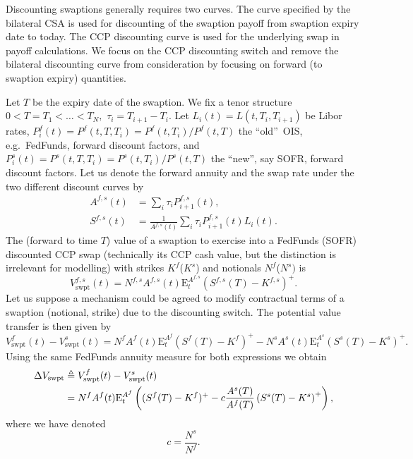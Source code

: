 \documentclass{article}
\begin{document}
Discounting swaptions generally requires two curves. The curve specified by
the bilateral CSA is used for discounting of the swaption payoff from
swaption expiry date to today. The CCP discounting curve is used for the
underlying swap in payoff calculations. We focus on the CCP discounting
switch and remove the bilateral discounting curve from consideration by
focusing on forward (to swaption expiry) quantities.

Let $T$ be the expiry date of the swaption. We fix a tenor structure $%
0<T=T_{1}<\dots <T_{N},$ $\tau _{i}=T_{i+1}-T_{i}$. Let $%
L_{i}(t)=L(t,T_{i},T_{i+1})$ be Libor rates, $%
P_{i}^{f}(t)=P^{f}(t,T,T_{i})=P^{f}(t,T_{i})/P^{f}(t,T)$ the
\textquotedblleft old\textquotedblright\ OIS, e.g.~FedFunds, forward
discount factors, and $%
P_{i}^{s}(t)=P^{s}(t,T,T_{i})=P^{s}(t,T_{i})/P^{s}(t,T)$ the
\textquotedblleft new\textquotedblright , say SOFR, forward discount
factors. Let us denote the forward annuity and the swap rate under the two
different discount curves by%
\begin{align*}
A^{f,s}(t)& =\sum_{i}\tau _{i}P_{i+1}^{f,s}(t), \\
S^{f,s}(t)& =\frac{1}{A^{f,s}(t)}\sum_{i}\tau _{i}P_{i+1}^{f,s}(t)L_{i}(t).
\end{align*}%
The (forward to time $T$) value of a swaption to exercise into a FedFunds
(SOFR) discounted CCP swap (technically its CCP cash value, but the
distinction is irrelevant for modelling) with strikes $K^{f}$($K^{s}$) and
notionals $N^{f}$($N^{s})$ is 
\begin{equation*}
V_{\mathrm{swpt}}^{f,s}(t)=N^{f,s}A^{f,s}(t)\mathrm{E}%
_{t}^{A^{f,s}}(S^{f,s}(T)-K^{f,s})^{+}.
\end{equation*}%
Let us suppose a mechanism could be agreed to modify contractual terms of a
swaption (notional, strike) due to the discounting switch. The potential
value transfer is then given by 
\begin{equation*}
V_{\mathrm{swpt}}^{f}(t)-V_{\mathrm{swpt}}^{s}(t)=N^{f}A^{f}(t)\mathrm{E}%
_{t}^{A^{f}}(S^{f}(T)-K^{f})^{+}-N^{s}A^{s}(t)\mathrm{E}%
_{t}^{A^{s}}(S^{s}(T)-K^{s})^{+}.
\end{equation*}%
Using the same FedFunds annuity measure for both expressions we obtain%
\begin{align*}
\Delta V_{\mathrm{swpt}}& \triangleq V_{\mathrm{swpt}}^{f}(t)-V_{\mathrm{swpt%
}}^{s}(t) \\
& =N^{f}A^{f}(t)\mathrm{E}_{t}^{A^{f}}\left( (S^{f}(T)-K^{f})^{+}-c\frac{%
A^{s}(T)}{A^{f}(T)}\left( S^{s}(T)-K^{s}\right) ^{+}\right) ,
\end{align*}%
where we have denoted%
\begin{equation}
c=\frac{N^{s}}{N^{f}}.  \label{eq:swpt1}
\end{equation}
\end{document}

